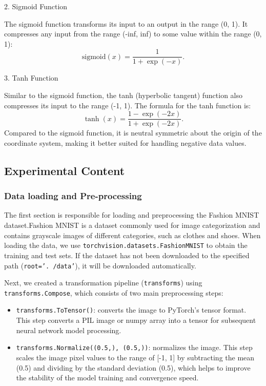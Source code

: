 \documentclass[a4paper,12pt]{article}
\begin{document}
2. Sigmoid Function

The sigmoid function transforms its input to an output in the range (0, 1). It compresses any input from the range (-inf, inf) to some value within the range (0, 1):
\begin{equation}
\text{sigmoid}(x) = \frac{1}{1 + \exp(-x)}.
\end{equation}

3. Tanh Function

Similar to the sigmoid function, the tanh (hyperbolic tangent) function also compresses its input to the range (-1, 1). The formula for the tanh function is:
\begin{equation}
\tanh(x) = \frac{1 - \exp(-2x)}{1 + \exp(-2x)}.
\end{equation}
Compared to the sigmoid function, it is neutral symmetric about the origin of the coordinate system, making it better suited for handling negative data values.

\subsection{Experimental Content}
\subsubsection{Data loading and Pre-processing}
The first section is responsible for loading and preprocessing the Fashion MNIST dataset.Fashion MNIST is a dataset commonly used for image categorization and contains grayscale images of different categories, such as clothes and shoes. When loading the data, we use \texttt{torchvision.datasets.FashionMNIST} to obtain the training and test sets. If the dataset has not been downloaded to the specified path (\texttt{root='. /data'}), it will be downloaded automatically.

Next, we created a transformation pipeline (\texttt{transforms}) using \texttt{transforms.Compose}, which consists of two main preprocessing steps:

\begin{itemize}
    \item \texttt{transforms.ToTensor()}: converts the image to PyTorch's tensor format. This step converts a PIL image or numpy array into a tensor for subsequent neural network model processing.
    
    \item \texttt{transforms.Normalize((0.5,), (0.5,))}: normalizes the image. This step scales the image pixel values to the range of [-1, 1] by subtracting the mean (0.5) and dividing by the standard deviation (0.5), which helps to improve the stability of the model training and convergence speed.
\end{itemize}
\end{document}
